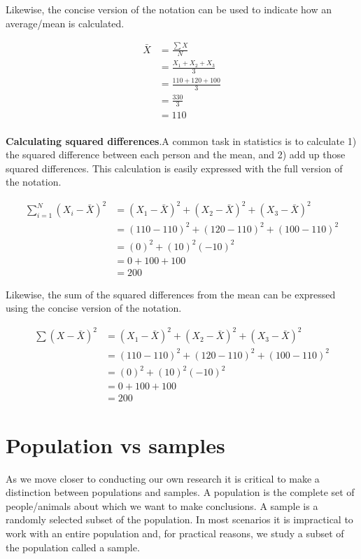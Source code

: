 \documentclass[
]{krantz}
\begin{document}
Likewise, the concise version of the notation can be used to indicate how an average/mean is calculated.

\[
\begin{aligned} 
\bar{X} &= \frac{\sum{X}}{N} \\
&= \frac{X_1 + X_2 + X_3}{3}\\ 
&= \frac{110 + 120 + 100}{3}\\
&= \frac{330}{3}\\
&= 110\\
\end{aligned} 
\]

\textbf{Calculating squared differences}.A common task in statistics is to calculate 1) the squared difference between each person and the mean, and 2) add up those squared differences. This calculation is easily expressed with the full version of the notation.

\[
\begin{aligned} 
\sum_{i=1}^{N}{(X_i - \bar{X})^2} &= (X_1-\bar{X})^2 + (X_2-\bar{X})^2 + (X_3-\bar{X})^2\\ 
&= (110-110)^2 + (120-110)^2 + (100-110)^2\\
&= (0)^2 + (10)^2 (-10)^2 \\
&= 0 + 100 + 100 \\
&= 200
\end{aligned} 
\]

Likewise, the sum of the squared differences from the mean can be expressed using the concise version of the notation.

\[
\begin{aligned} 
\sum{(X - \bar{X})^2} &= (X_1-\bar{X})^2 + (X_2-\bar{X})^2 + (X_3-\bar{X})^2\\ 
&= (110-110)^2 + (120-110)^2 + (100-110)^2\\
&= (0)^2 + (10)^2 (-10)^2 \\
&= 0 + 100 + 100 \\
&= 200
\end{aligned} 
\]

\hypertarget{population-vs-samples}{%
\section{Population vs samples}\label{population-vs-samples}}

As we move closer to conducting our own research it is critical to make a distinction between populations and samples. A population is the complete set of people/animals about which we want to make conclusions. A sample is a randomly selected subset of the population. In most scenarios it is impractical to work with an entire population and, for practical reasons, we study a subset of the population called a sample.
\end{document}
